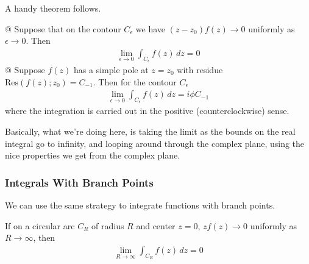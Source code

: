         A handy theorem follows.
        \begin{thm}
            \begin{easylist}[enumerate]
                @ Suppose that on the contour $C_\epsilon$ we have $(z-z_0)f(z)\to0$
                uniformly as $\epsilon\to0$. Then
                \begin{align*}
                    \lim_{\epsilon\to0} \int_{C_\epsilon} f(z) \, dz = 0
                \end{align*}
                @ Suppose $f(z)$ has a simple pole at $z=z_0$ with residue
                $\text{Res}(f(z); z_0) = C_{-1}$. Then for the contour
                $C_\epsilon$
                \begin{align*}
                    \lim_{\epsilon\to0} \int_{C_\epsilon} f(z) \, dz =
                    i \phi C_{-1}
                \end{align*}
                where the integration is carried out in the positive
                (counterclockwise) sense.
            \end{easylist}
        \end{thm}
        Basically, what we're doing here, is taking the limit as the bounds on
        the real integral go to infinity, and looping around through the complex
        plane, using the nice properties we get from the complex plane.

        \subsubsection{Integrals With Branch Points}
        We can use the same strategy to integrate functions with branch points.
        \begin{thm}
            If on a circular arc $C_R$ of radius $R$ and center $z=0$,
            $zf(z)\to0$ uniformly as $R\to\infty$, then
            \begin{align*}
                \lim_{R\to\infty} \int_{C_R} f(z) \, dz = 0
            \end{align*}
        \end{thm}

